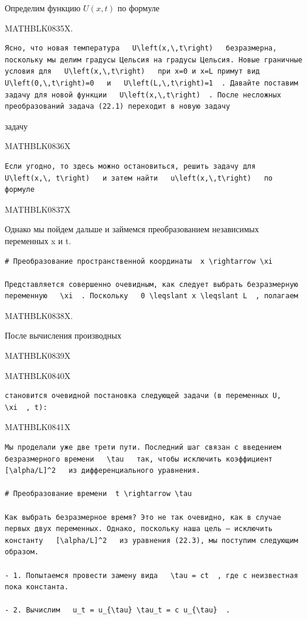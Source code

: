 \documentclass[
]{article}
\begin{document}
Определим функцию \(U(x, t)\) по формуле

MATHBLK0835X.

\begin{verbatim}
Ясно, что новая температура   U\left(x,\,t\right)   безразмерна, поскольку мы делим градусы Цельсия на градусы Цельсия. Новые граничные условия для   U\left(x,\,t\right)   при x=0 и x=L примут вид   U\left(0,\,t\right)=0   и   U\left(L,\,t\right)=1  . Давайте поставим задачу для новой функции   U\left(x,\,t\right)  . После несложных преобразований задача (22.1) переходит в новую задачу
\end{verbatim}

задачу

MATHBLK0836X

\begin{verbatim}
Если угодно, то здесь можно остановиться, решить задачу для   U\left(x,\, t\right)   и затем найти   u\left(x,\,t\right)   по формуле
\end{verbatim}

MATHBLK0837X

Однако мы пойдем дальше и займемся преобразованием независимых
переменных x и t.

\begin{verbatim}
# Преобразование пространственной координаты  x \rightarrow \xi

Представляется совершенно очевидным, как следует выбрать безразмерную переменную   \xi  . Поскольку   0 \leqslant x \leqslant L  , полагаем
\end{verbatim}

MATHBLK0838X.

После вычисления производных

MATHBLK0839X

MATHBLK0840X

\begin{verbatim}
становится очевидной постановка следующей задачи (в переменных U,   \xi  , t):
\end{verbatim}

MATHBLK0841X

\begin{verbatim}
Мы проделали уже две трети пути. Последний шаг связан с введением безразмерного времени   \tau   так, чтобы исключить коэффициент   [\alpha/L]^2   из дифференциального уравнения.

# Преобразование времени  t \rightarrow \tau

Как выбрать безразмерное время? Это не так очевидно, как в случае первых двух переменных. Однако, поскольку наша цель — исключить константу   [\alpha/L]^2   из уравнения (22.3), мы поступим следующим образом.

- 1. Попытаемся провести замену вида   \tau = ct  , где c неизвестная пока константа.

- 2. Вычислим   u_t = u_{\tau} \tau_t = c u_{\tau}  .
\end{verbatim}
\end{document}

